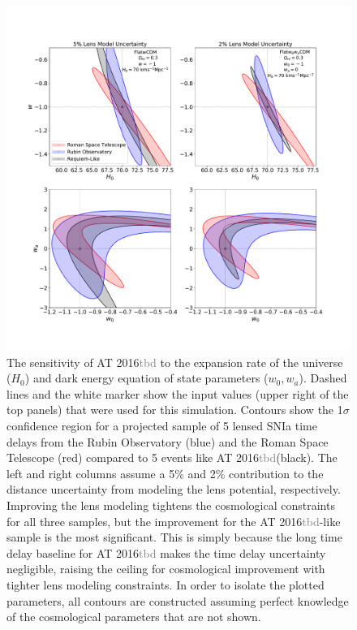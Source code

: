 \documentclass[12pt,dvipsnames]{article}
\def\SNABC{AT 2016{\textcolor{Gray}{tbd}}\xspace}
\begin{document}
\clearpage
\begin{figure}
    \centering
    \includegraphics[draft=False,trim={2cm, 3cm, 3cm, 4cm},clip,width=\textwidth]{Paper/Figures/snrequiem_hw_w0wa_apples_to_lsst_ngrst_4panel.pdf}
    \caption{  
    The sensitivity of \SNABC to the expansion rate of the universe ($H_0$) and dark energy equation of state parameters ($w_0, w_a$). Dashed lines and the white marker show the input values (upper right of the top panels) that were used for this simulation. Contours show the 1$\sigma$ confidence region for a projected sample of 5 lensed SNIa time delays from the Rubin Observatory (blue) and the Roman Space Telescope (red) compared to 5 events like \SNABC (black).  The left and right columns assume a 5\% and 2\% contribution to the distance uncertainty from modeling the lens potential, respectively. Improving the lens modeling tightens the cosmological constraints for all three samples, but the improvement for the \SNABC-like sample is the most significant.  This is simply because the long time delay baseline for \SNABC makes the time delay uncertainty negligible, raising the ceiling for cosmological improvement with tighter lens modeling constraints.  In order to isolate the plotted parameters, all contours are constructed assuming perfect knowledge of the cosmological parameters that are not shown. 
    }
    \label{fig:cosmo}
\end{figure}
\end{document}
